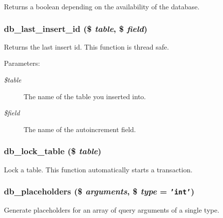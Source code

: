 Returns a boolean depending on the availability of the database. \hypertarget{group__database_g1d29b142caeee2f0f2217be16857b9ae}{
\subsubsection[{db\_\-last\_\-insert\_\-id}]{\setlength{\rightskip}{0pt plus 5cm}db\_\-last\_\-insert\_\-id (\$ {\em table}, \/  \$ {\em field})}}
\label{group__database_g1d29b142caeee2f0f2217be16857b9ae}


Returns the last insert id. This function is thread safe.

\begin{Desc}
\item[Parameters:]
\begin{description}
\item[{\em \$table}]The name of the table you inserted into. \item[{\em \$field}]The name of the autoincrement field. \end{description}
\end{Desc}
\hypertarget{group__database_g8584042b05393a82b7d06c2ee6cf95ed}{
\subsubsection[{db\_\-lock\_\-table}]{\setlength{\rightskip}{0pt plus 5cm}db\_\-lock\_\-table (\$ {\em table})}}
\label{group__database_g8584042b05393a82b7d06c2ee6cf95ed}


Lock a table. This function automatically starts a transaction. \hypertarget{group__database_g8d4c967b43af1b9d9fec0466102c490c}{
\subsubsection[{db\_\-placeholders}]{\setlength{\rightskip}{0pt plus 5cm}db\_\-placeholders (\$ {\em arguments}, \/  \$ {\em type} = {\tt 'int'})}}
\label{group__database_g8d4c967b43af1b9d9fec0466102c490c}


Generate placeholders for an array of query arguments of a single type.

